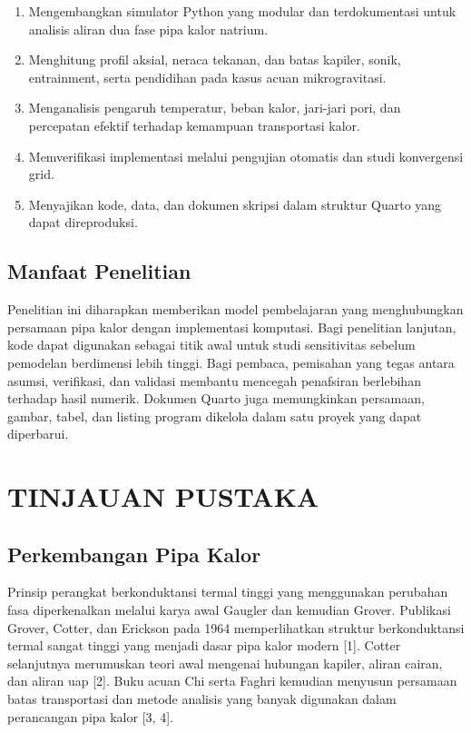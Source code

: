 \documentclass[
  12pt,a4paper,oneside]{report}
\providecommand{\tightlist}{%
  \setlength{\itemsep}{0pt}\setlength{\parskip}{0pt}}
\begin{document}
\begin{enumerate}
\def\labelenumi{\arabic{enumi}.}
\tightlist
\item
  Mengembangkan simulator Python yang modular dan terdokumentasi untuk
  analisis aliran dua fase pipa kalor natrium.
\item
  Menghitung profil aksial, neraca tekanan, dan batas kapiler, sonik,
  entrainment, serta pendidihan pada kasus acuan mikrogravitasi.
\item
  Menganalisis pengaruh temperatur, beban kalor, jari-jari pori, dan
  percepatan efektif terhadap kemampuan transportasi kalor.
\item
  Memverifikasi implementasi melalui pengujian otomatis dan studi
  konvergensi grid.
\item
  Menyajikan kode, data, dan dokumen skripsi dalam struktur Quarto yang
  dapat direproduksi.
\end{enumerate}

\hypertarget{manfaat-penelitian}{%
\section{Manfaat Penelitian}\label{manfaat-penelitian}}

Penelitian ini diharapkan memberikan model pembelajaran yang
menghubungkan persamaan pipa kalor dengan implementasi komputasi. Bagi
penelitian lanjutan, kode dapat digunakan sebagai titik awal untuk studi
sensitivitas sebelum pemodelan berdimensi lebih tinggi. Bagi pembaca,
pemisahan yang tegas antara asumsi, verifikasi, dan validasi membantu
mencegah penafsiran berlebihan terhadap hasil numerik. Dokumen Quarto
juga memungkinkan persamaan, gambar, tabel, dan listing program dikelola
dalam satu proyek yang dapat diperbarui.

\hypertarget{tinjauan-pustaka}{%
\chapter{TINJAUAN PUSTAKA}\label{tinjauan-pustaka}}

\hypertarget{perkembangan-pipa-kalor}{%
\section{Perkembangan Pipa Kalor}\label{perkembangan-pipa-kalor}}

Prinsip perangkat berkonduktansi termal tinggi yang menggunakan
perubahan fasa diperkenalkan melalui karya awal Gaugler dan kemudian
Grover. Publikasi Grover, Cotter, dan Erickson pada 1964 memperlihatkan
struktur berkonduktansi termal sangat tinggi yang menjadi dasar pipa
kalor modern {[}1{]}. Cotter selanjutnya merumuskan teori awal mengenai
hubungan kapiler, aliran cairan, dan aliran uap {[}2{]}. Buku acuan Chi
serta Faghri kemudian menyusun persamaan batas transportasi dan metode
analisis yang banyak digunakan dalam perancangan pipa kalor {[}3, 4{]}.
\end{document}
